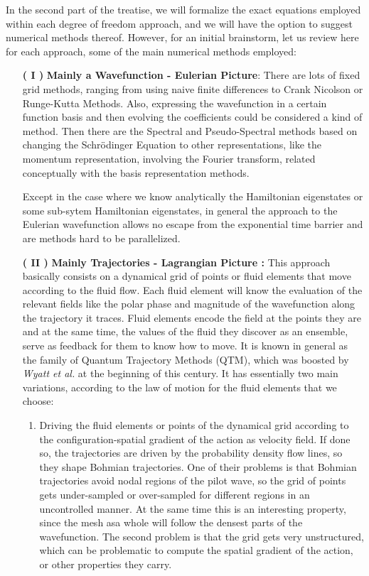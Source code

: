 \documentclass[11pt, a4paper]{article} %
\begin{document}
In the second part of the treatise, we will formalize the exact equations employed within each degree of freedom approach, and we will have the option to suggest numerical methods thereof. However, for an initial brainstorm, let us review here for each approach, some of the main numerical methods employed:
\begin{enumerate}
\item[\bf ( I )] {\bf Mainly a Wavefunction - Eulerian Picture}: There are lots of fixed grid methods, ranging from using naive finite differences to Crank Nicolson or Runge-Kutta Methods. Also, expressing the wavefunction in a certain function basis and then evolving the coefficients could be considered a kind of method. Then there are the Spectral and Pseudo-Spectral methods based on changing the Schrödinger Equation to other representations, like the momentum representation, involving the Fourier transform, related conceptually with the basis representation methods. 

Except in the case where we know analytically the Hamiltonian eigenstates or some sub-sytem Hamiltonian eigenstates, in general the approach to the Eulerian wavefunction allows no escape from the exponential time barrier and are methods hard to be parallelized.

\item [\bf ( II )] {\bf Mainly Trajectories - Lagrangian Picture :} This approach basically consists on a dynamical grid of points or fluid elements that move according to the fluid flow. Each fluid element will know the evaluation of the relevant fields like the polar phase and magnitude of the wavefunction along the trajectory it traces. Fluid elements encode the field at the points they are and at the same time, the values of the fluid they discover as an ensemble, serve as feedback for them to know how to move. It is known in general as the family of Quantum Trajectory Methods (QTM), which was boosted by {\em Wyatt et al.} at the beginning of this century. It has essentially two main variations, according to the law of motion for the fluid elements that we choose:
\begin{enumerate}
\item Driving the fluid elements or points of the dynamical grid  according to the configuration-spatial gradient of the action as velocity field. If done so, the trajectories are driven by the probability density flow lines, so they shape Bohmian trajectories. One of their problems is that Bohmian trajectories avoid nodal regions of the pilot wave, so the grid of points gets under-sampled or over-sampled for different regions in an uncontrolled manner. At the same time this is an interesting property, since the mesh asa whole will follow the densest parts of the wavefunction. The second problem is that the grid gets very unstructured, which can be problematic to compute the spatial gradient of the action, or other properties they carry.


\end{enumerate}
\end{enumerate}
\end{document}

